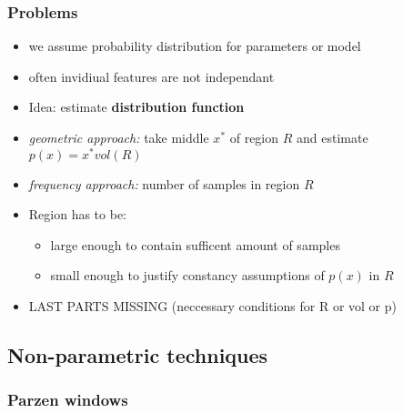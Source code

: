 \documentclass[11pt]{article}
\begin{document}
\subsubsection{Problems}
\label{sec-9-3-3}
\begin{itemize}
\item we assume probability distribution for parameters or model
\item often invidiual features are not independant
\item Idea: estimate \textbf{distribution function}
\item \emph{geometric approach:} take middle $x^*$ of region $R$ and estimate $p(x)= x^* vol(R)$
\item \emph{frequency approach:} number of samples in region $R$
\item Region has to be:
\begin{itemize}
\item large enough to contain sufficent amount of samples
\item small enough to justify constancy assumptions of $p(x)$ in $R$
\end{itemize}
\item LAST PARTS MISSING (neccessary conditions for R or vol or p)
\end{itemize}
\subsection{Non-parametric techniques}
\label{sec-9-4}
\subsubsection{Parzen windows}
\label{sec-9-4-1}
\end{document}
